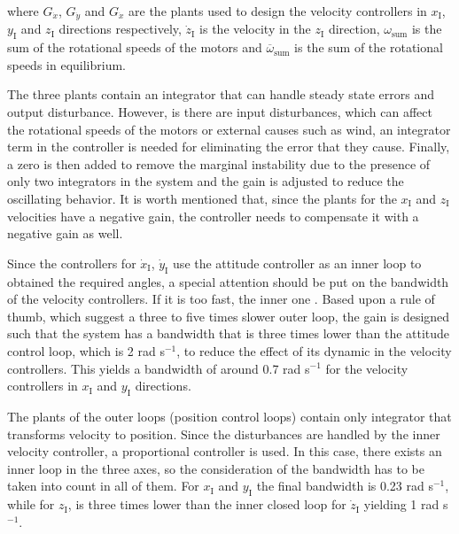 \noindent where $G_{\dot{x}}$, $G_{\dot{y}}$ and $G_{\dot{x}}$  are the plants used to design the velocity controllers in $x_{\mathrm{I}}$, $y_{\mathrm{I}}$ and $z_{\mathrm{I}}$ directions respectively,  $\dot{z}_\mathrm{I}$ is the velocity in the $z_{\mathrm{I}}$ direction, $\omega_{\mathrm{sum}}$ is the sum of the rotational speeds of the motors and $\overline{\omega}_{\mathrm{sum}}$ is the sum of the rotational speeds in equilibrium.

The three plants contain an integrator that can handle steady state errors and output disturbance. However, is there are input disturbances, which can affect the rotational speeds of the motors or external causes such as wind, an integrator term in the controller is needed for eliminating the error that they cause. Finally, a zero is then added to remove the marginal instability due to the presence of only two integrators in the system and the gain is adjusted to reduce the oscillating behavior. It is worth mentioned that, since the plants for the $x_{\mathrm{I}}$ and $z_{\mathrm{I}}$ velocities have a negative gain, the controller needs to compensate it with a negative gain as well.

Since the controllers for $\dot{x}_{\mathrm{I}}$, $\dot{y}_{\mathrm{I}}$ use the attitude controller as an inner loop to obtained the required angles, a special attention should be put on the bandwidth of the velocity controllers. If it is too fast, the inner one . Based upon a rule of thumb, which suggest a three to five times slower outer loop, the gain is designed such that the system has a bandwidth that is three times lower than the attitude control loop, which is 2 rad s$^{-1}$, to reduce the effect of its dynamic in the velocity controllers. This yields a bandwidth of around 0.7 rad s$^{-1}$ for the velocity controllers in $x_{\mathrm{I}}$ and $y_{\mathrm{I}}$ directions.


The plants of the outer loops (position control loops) contain only integrator that transforms velocity to position. Since the disturbances are handled by the inner velocity controller, a proportional controller is used. In this case, there exists an inner loop in the three axes, so the consideration of the bandwidth has to be taken into count in all of them. For $x_{\mathrm{I}}$ and $y_{\mathrm{I}}$ the final bandwidth is 0.23 rad s$^{-1}$, while for $z_{\mathrm{I}}$, is three times lower than the inner closed loop for $\dot{z}_{\mathrm{I}}$ yielding 1 rad s$^{-1}$.

